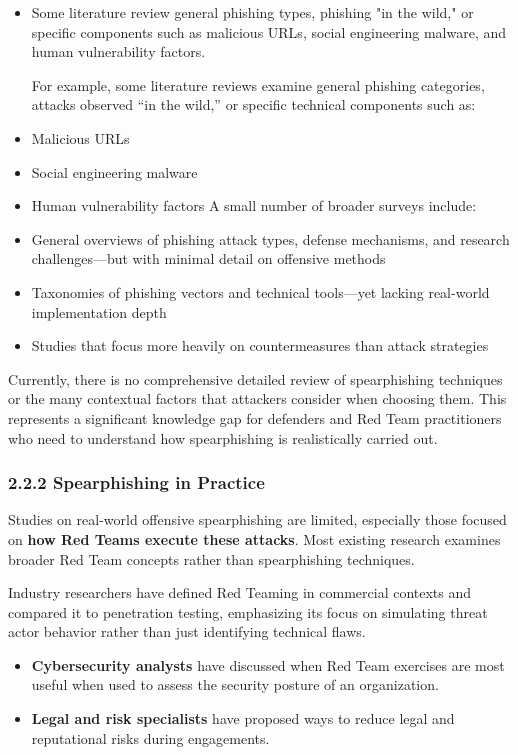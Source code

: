  \begin{itemize}
    \item Some literature review general phishing types, phishing "in the wild," or specific components such as malicious URLs, social engineering malware, and human vulnerability factors.

For example, some literature reviews examine general phishing categories, attacks observed “in the wild,” or specific technical components such as:
\item Malicious URLs
\item Social engineering malware
\item Human vulnerability factors
A small number of broader surveys include:
\item General overviews of phishing attack types, defense mechanisms, and research challenges—but with minimal detail on offensive methods
        \item Taxonomies of phishing vectors and technical tools—yet lacking real-world implementation depth
        \item Studies that focus more heavily on countermeasures than attack strategies
    \end{itemize}

Currently, there is no comprehensive detailed review of spearphishing techniques or the many contextual factors that attackers consider when choosing them. This represents a significant knowledge gap for defenders and Red Team practitioners who need to understand how spearphishing is realistically carried out.

\subsubsection{2.2.2 Spearphishing in Practice}

Studies on real-world offensive spearphishing are limited, especially those focused on \textbf{how Red Teams execute these attacks}. Most existing research examines broader Red Team concepts rather than spearphishing techniques.

Industry researchers have defined Red Teaming in commercial contexts and compared it to penetration testing, emphasizing its focus on simulating threat actor behavior rather than just identifying technical flaws.
\begin{itemize}
    \item \textbf{Cybersecurity analysts} have discussed when Red Team exercises are most useful when used to assess the security posture of an organization.
    \item \textbf{Legal and risk specialists} have proposed ways to reduce legal and reputational risks during engagements.
\end{itemize}

